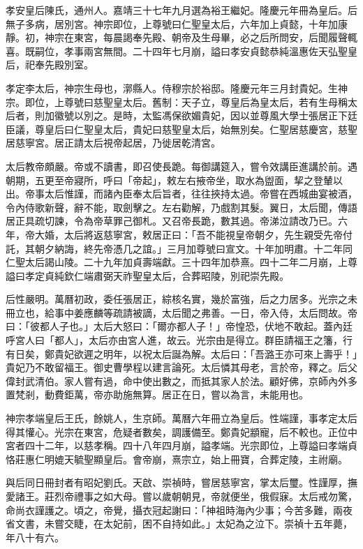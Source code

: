 孝安皇后陳氏，通州人。嘉靖三十七年九月選為裕王繼妃。隆慶元年冊為皇后。后無子多病，居別宮。神宗即位，上尊號曰仁聖皇太后，六年加上貞懿，十年加康靜。初，神宗在東宮，每晨謁奉先殿、朝帝及生母畢，必之后所問安，后聞履聲輒喜。既嗣位，孝事兩宮無間。二十四年七月崩，謚曰孝安貞懿恭純溫惠佐天弘聖皇后，祀奉先殿別室。

孝定李太后，神宗生母也，漷縣人。侍穆宗於裕邸。隆慶元年三月封貴妃。生神宗。即位，上尊號曰慈聖皇太后。舊制：天子立，尊皇后為皇太后，若有生母稱太后者，則加徽號以別之。是時，太監馮保欲媚貴妃，因以並尊風大學士張居正下廷臣議，尊皇后曰仁聖皇太后，貴妃曰慈聖皇太后，始無別矣。仁聖居慈慶宮，慈聖居慈寧宮。居正請太后視帝起居，乃徙居乾清宮。

太后教帝頗嚴。帝或不讀書，即召使長跪。每御講筵入，嘗令效講臣進講於前。遇朝期，五更至帝寢所，呼曰「帝起」，敕左右掖帝坐，取水為盥面，挈之登輦以出。帝事太后惟謹，而諸內臣奉太后旨者，往往挾持太過。帝嘗在西城曲宴被酒，令內侍歌新聲，辭不能，取劍擊之。左右勸解，乃戲割其髮。翼日，太后聞，傳語居正具疏切諫，令為帝草罪己御札。又召帝長跪，數其過。帝涕泣請改乃已。六年，帝大婚，太后將返慈寧宮，敕居正曰：「吾不能視皇帝朝夕，先生親受先帝付託，其朝夕納誨，終先帝憑几之誼。」三月加尊號曰宣文。十年加明肅。十二年同仁聖太后謁山陵。二十九年加貞壽端獻。三十四年加恭熹。四十二年二月崩，上尊謚曰孝定貞純欽仁端肅弼天祚聖皇太后，合葬昭陵，別祀崇先殿。

后性嚴明。萬曆初政，委任張居正，綜核名實，幾於富強，后之力居多。光宗之未冊立也，給事中姜應麟等疏請被謫，太后聞之弗善。一日，帝入侍，太后問故。帝曰：「彼都人子也。」太后大怒曰：「爾亦都人子！」帝惶恐，伏地不敢起。蓋內廷呼宮人曰「都人」，太后亦由宮人進，故云。光宗由是得立。群臣請福王之籓，行有日矣，鄭貴妃欲遲之明年，以祝太后誕為解。太后曰：「吾潞王亦可來上壽乎！」貴妃乃不敢留福王。御史曹學程以建言論死。太后憐其母老，言於帝，釋之。后父偉封武清伯。家人嘗有過，命中使出數之，而抵其家人於法。顧好佛，京師內外多置梵剎，動費鉅萬，帝亦助施無算。居正在日，嘗以為言，未能用也。

神宗孝端皇后王氏，餘姚人，生京師。萬曆六年冊立為皇后。性端謹，事孝定太后得其懽心。光宗在東宮，危疑者數矣，調護備至。鄭貴妃顓寵，后不較也。正位中宮者四十二年，以慈孝稱。四十八年四月崩，謚孝端。光宗即位，上尊謚曰孝端貞恪莊惠仁明媲天毓聖顯皇后。會帝崩，熹宗立，始上冊寶，合葬定陵，主祔廟。

與后同日冊封者有昭妃劉氏。天啟、崇禎時，嘗居慈寧宮，掌太后璽。性謹厚，撫愛諸王。莊烈帝禮事之如大母。嘗以歲朝朝見，帝就便坐，俄假寐。太后戒勿驚，命尚衣謹護之。頃之，帝覺，攝衣冠起謝曰：「神祖時海內少事；今苦多難，兩夜省文書，未嘗交睫，在太妃前，困不自持如此。」太妃為之泣下。崇禎十五年薨，年八十有六。

